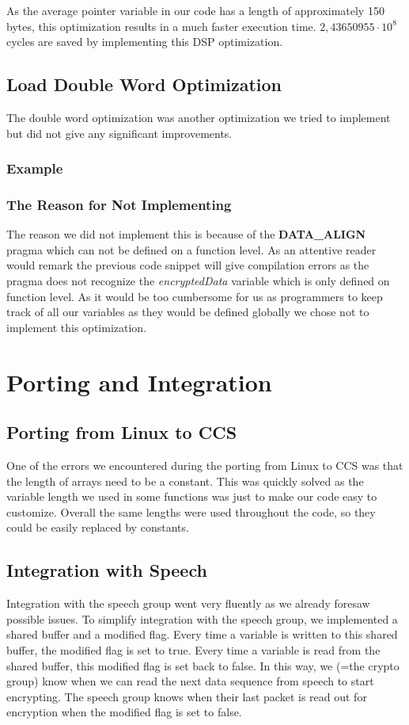 \documentclass[a4paper]{article}
\begin{document}
As the average pointer variable in our code has a length of approximately 150 bytes, this optimization results in a much faster execution time. $2,43650955\cdot10^{8}$ cycles are saved by implementing this DSP optimization.

\subsection{Load Double Word Optimization}
The double word optimization was another optimization we tried to implement but did not give any significant improvements.

\subsubsection{Example}


\subsubsection{The Reason for Not Implementing}
The reason we did not implement this is because of the \textbf{DATA\_ALIGN} pragma which can not be defined on a function level. As an attentive reader would remark the previous code snippet will give compilation errors as the pragma does not recognize the \textit{encryptedData} variable which is only defined on function level. As it would be too cumbersome for us as programmers to keep track of all our variables as they would be defined globally we chose not to implement this optimization.

\section{Porting and Integration}

\subsection{Porting from Linux to CCS}
One of the errors we encountered during the porting from Linux to CCS was that the length of arrays need to be a constant. This was quickly solved as the variable length we used in some functions was just to make our code easy to customize. Overall the same lengths were used throughout the code, so they could be easily replaced by constants.

\subsection{Integration with Speech}
Integration with the speech group went very fluently as we already foresaw possible issues. To simplify integration with the speech group, we implemented a shared buffer and a modified flag. Every time a variable is written to this shared buffer, the modified flag is set to true. Every time a variable is read from the shared buffer, this modified flag is set back to false. In this way, we (=the crypto group) know when we can read the next data sequence from speech to start encrypting. The speech group knows when their last packet is read out for encryption when the modified flag is set to false.\\
\end{document}
